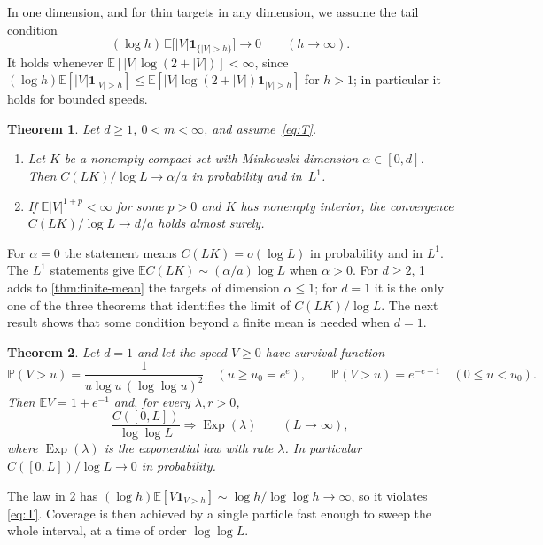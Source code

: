 \documentclass[11pt,a4paper]{article}
\numberwithin{equation}{section}
\newtheorem{theorem}{Theorem}[section]
\theoremstyle{definition}
\theoremstyle{remark}
\newcommand{\E}{\mathbb E}
\newcommand{\Pp}{\mathbb P}
\newcommand{\ind}{\mathbf 1}
\newcommand{\abs}[1]{\lvert#1\rvert}
\begin{document}
In one dimension, and for thin targets in any dimension, we assume the tail
condition
\begin{equation}\label{eq:T}
(\log h)\,\E\bigl[\abs{V}\ind_{\{\abs{V}>h\}}\bigr]\to0\qquad(h\to\infty).
\tag{T}
\end{equation}
It holds whenever $\E[\abs{V}\log(2+\abs{V})]<\infty$, since
$(\log h)\E[\abs{V}\ind_{\abs{V}>h}]\le\E[\abs{V}\log(2+\abs{V})\ind_{\abs{V}>h}]$
for $h>1$; in particular it holds for bounded speeds.

\begin{theorem}\label{thm:log-moment}
Let $d\ge1$, $0<m<\infty$, and assume~\eqref{eq:T}.
\begin{enumerate}[label=(\roman*)]
\item Let $K$ be a nonempty compact set with Minkowski dimension
$\alpha\in[0,d]$. Then $C(LK)/\log L\to\alpha/a$ in probability and
in~$L^1$.
\item If $\E\abs{V}^{1+p}<\infty$ for some $p>0$ and $K$ has nonempty
interior, the convergence $C(LK)/\log L\to d/a$ holds almost surely.
\end{enumerate}
\end{theorem}

For $\alpha=0$ the statement means $C(LK)=o(\log L)$ in probability and in
$L^1$. The $L^1$ statements give $\E C(LK)\sim(\alpha/a)\log L$ when
$\alpha>0$. For $d\ge2$, \cref{thm:log-moment} adds to \cref{thm:finite-mean}
the targets of dimension $\alpha\le1$; for $d=1$ it is the only one of the
three theorems that identifies the limit of $C(LK)/\log L$. The next result shows that some condition beyond a finite mean is
needed when $d=1$.

\begin{theorem}\label{thm:heavy}
Let $d=1$ and let the speed $V\ge0$ have survival function
\[
\Pp(V>u)=\frac{1}{u\log u\,(\log\log u)^2}\quad(u\ge u_0=e^e),\qquad
\Pp(V>u)=e^{-e-1}\quad(0\le u<u_0).
\]
Then $\E V=1+e^{-1}$ and, for every $\lambda,r>0$,
\[
\frac{C([0,L])}{\log\log L}\Longrightarrow\operatorname{Exp}(\lambda)
\qquad(L\to\infty),
\]
where $\operatorname{Exp}(\lambda)$ is the exponential law with rate
$\lambda$. In particular $C([0,L])/\log L\to0$ in probability.
\end{theorem}

The law in \cref{thm:heavy} has
$(\log h)\E[V\ind_{V>h}]\sim\log h/\log\log h\to\infty$, so it violates
\eqref{eq:T}. Coverage is then achieved by a single particle fast enough to
sweep the whole interval, at a time of order $\log\log L$.
\end{document}
